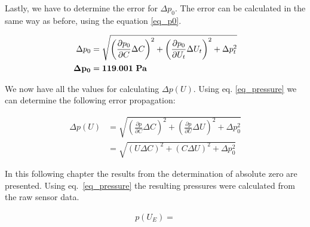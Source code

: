     Lastly, we have to determine the error for $\Delta p_0$. The error can be calculated in the same way as before, using the equation \ref{eq_p0}.

    \begin{align}
        \Delta p_0 &= \sqrt{ \left(\frac{\partial p_0}{\partial C} \Delta C \right)^2 +
                            \left(\frac{\partial p_0}{\partial U_t} \Delta U_t \right)^2 +
                            \Delta p_t^2}\\
        \bf \Delta p_0 &= \bf 119.001 ~\si{\bf\pascal} \label{dlta_p0}
    \end{align}

    We now have all the values for calculating $\Delta p(U)$. Using eq. \ref{eq_pressure} we can determine the following error propagation:

    \begin{align}
        \Delta p(U) &= \sqrt{ \left(\frac{\partial p}{\partial C} \Delta C \right)^2 +
                            \left(\frac{\partial p}{\partial U} \Delta U \right)^2 +
                            \Delta p_0^2}\\
        &= \sqrt{ \left( U \Delta C \right)^2 +
                \left( C \Delta U \right)^2 + 
                \Delta p_0^2} \label{eq_dlta_p}
    \end{align}

    In this following chapter the results from the determination of absolute zero are presented.
    Using eq.~\ref{eq_pressure} the resulting pressures were calculated from the raw sensor data.

    \begin{align}
        p(U_E) = 
    \end{align}





